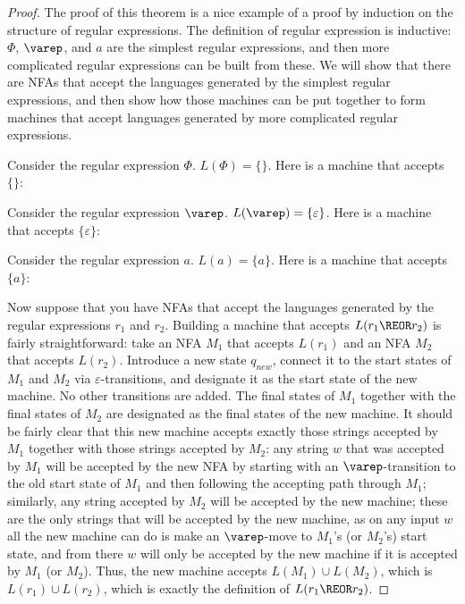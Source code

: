 \begin{proof} The proof of this theorem is a nice example of a proof by induction on
the structure of regular expressions.  The definition of regular expression is
inductive: $\Phi$, $\varep$, and $a$ are the simplest regular expressions,
and then more complicated regular expressions can be built from these.  We will
show that there are NFAs that accept the languages generated by the simplest
regular expressions, and then show how those machines can be put together to
form machines that accept languages generated by more complicated regular
expressions.

Consider the regular expression $\Phi$.  $L(\Phi) = \{\}$.  Here is a machine
that accepts $\{\}$: 


Consider the regular expression $\varep$.  $L(\varep) = \{\varepsilon\}$.  
Here is a machine that accepts $\{\varepsilon\}$:


Consider the regular expression $a$.  $L(a) = \{a\}$.  Here is a
machine that accepts $\{a\}$:


Now suppose that you have NFAs that accept the languages generated by the
regular expressions $r_1$ and $r_2$.  Building a machine that accepts $L(r_1 \REOR 
r_2)$ is fairly straightforward: take an NFA $M_1$ that accepts $L(r_1)$ and an
NFA $M_2$ that accepts $L(r_2)$.  Introduce a new state $q_{new}$, connect
it to the start states of $M_1$ and $M_2$ via $\varepsilon$-transitions, and
designate it as the start state of the new machine.  No other transitions are
added.  The final states of $M_1$ together with the final states of $M_2$ are
designated as the final states of the new machine.  It should be fairly clear
that this new machine accepts exactly those strings accepted by $M_1$ together
with those strings accepted by $M_2$: any string $w$ that was accepted by $M_1$
will be accepted by the new NFA by starting with an $\varep$-transition to the
old start state of $M_1$ and then following the accepting path through $M_1$;
similarly, any string accepted by $M_2$ will be accepted by the new machine;
these are the only strings that will be accepted by the new machine, as on any
input $w$ all the new machine can do is make an $\varep$-move to $M_1$'s (or
$M_2$'s) start state, and from there $w$ will only be accepted by the new
machine if it is accepted by $M_1$ (or $M_2$).  Thus, the new machine accepts
$L(M_1) \cup L(M_2)$, which is $L(r_1) \cup L(r_2)$, which is exactly the
definition of $L(r_1 \REOR  r_2)$.


\end{proof}
